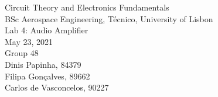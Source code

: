 
\thispagestyle {empty}


\begin{center}
%
\vspace{1.0cm}

\vspace{1cm}
{\FontLb Circuit Theory and Electronics Fundamentals} \\ %
\vspace{1cm}
{\FontSn BSc Aerospace Engineering, Técnico, University of Lisbon} \\ %
\vspace{1cm}
{\FontSn Lab 4: Audio Amplifier} \\
\vspace{1cm}
{\FontSn May 23, 2021} \\ %
\vspace{1cm}
{\FontSn Group 48} \\ %
{\FontSn Dinis Papinha, 84379} \\ %
{\FontSn Filipa Gonçalves, 89662} \\ %
{\FontSn Carlos de Vasconcelos, 90227} \\ %
%
\end{center}
